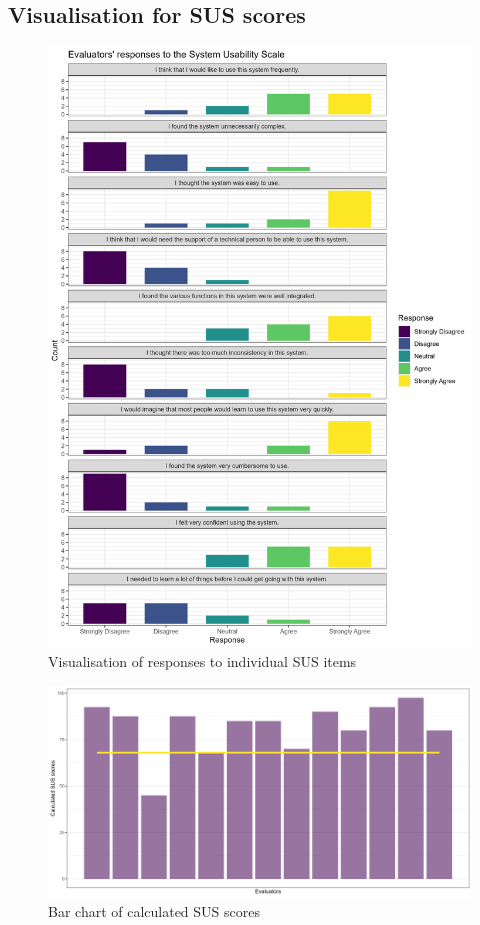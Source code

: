 \documentclass{l4proj}
\begin{document}
\begin{appendices}
 \section{Visualisation for SUS scores}

 \begin{figure}[H]
    \centering
    \includegraphics[width=1\linewidth]{images/sus_count_res.png}
    \caption{Visualisation of responses to individual SUS items}
    \label{fig:sus_items_visual} 
\end{figure}

 \begin{figure}[H]
    \centering
    \includegraphics[width=1\linewidth]{images/sus_barchart.png}
    \caption{Bar chart of calculated SUS scores}
    \label{fig:sus_bar_visual} 
\end{figure}


\end{appendices}
\end{document}
